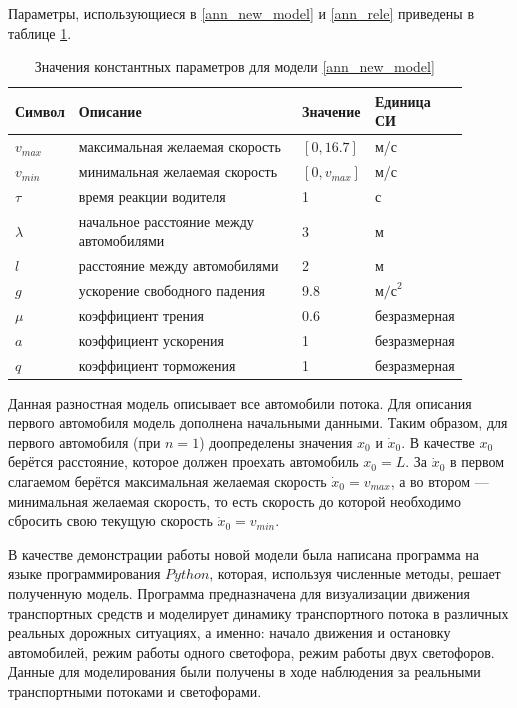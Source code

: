 \documentclass[12pt, a4paper]{extarticle}
\numberwithin{equation}{section}
\numberwithin{figure}{section}
\begin{document}
Параметры, использующиеся в \eqref{ann_new_model} и \eqref{ann_rele} приведены в таблице \ref{parameters}.

\begin{table}[h!]
	\caption{Значения константных параметров для модели \eqref{ann_new_model} }
	\label{parameters}
	\begin{center}
		\begin{tabularx}{\textwidth}{p{0.12\linewidth}p{0.52\linewidth}p{0.11\linewidth}p{0.15\linewidth}}			
			\hline
			\rule{0cm}{0,5cm}
			Символ & Описание & Значение & Единица СИ \\
			[3pt]\hline
			$v_{max}$ & максимальная желаемая скорость& $[0,16.7]$&м/с\\
			$v_{min}$ & минимальная желаемая скорость& $[0,v_{max}]$&м/с\\ 
			$\tau$ & время реакции водителя& 1&с\\
			$\lambda$ & начальное расстояние между автомобилями& 3&м\\
			$l$ & расстояние между автомобилями& 2&м\\
			$g$ & ускорение свободного падения& 9.8&$\text{м/с}^2$\\ 
			$\mu$ & коэффициент трения& 0.6& безразмерная\\ 
			$a$ & коэффициент ускорения& 1& безразмерная\\
			$q$ & коэффициент торможения& 1& безразмерная\\
			\hline
		\end{tabularx}
	\end{center}
\end{table}

Данная разностная модель описывает все автомобили потока. Для описания первого автомобиля модель  дополнена начальными данными. Таким образом, для первого автомобиля (при $n=1$) доопределены значения $x_{0}$ и $\dot{x}_{0}$. В качестве $x_{0}$ берётся расстояние, которое должен проехать автомобиль $x_{0}=L$. За $\dot{x}_{0}$ в первом слагаемом берётся максимальная желаемая скорость $\dot{x}_{0}=v_{max}$, а во втором --- минимальная желаемая скорость, то есть скорость до которой необходимо сбросить свою текущую скорость $\dot{x}_{0}=v_{min}$.

В качестве демонстрации работы новой модели была написана программа на языке программирования $Python$, которая, используя численные методы, решает полученную модель. Программа предназначена для визуализации движения транспортных средств и моделирует динамику транспортного потока в различных реальных дорожных ситуациях, а именно: начало движения и остановку автомобилей, режим работы одного светофора, режим работы двух светофоров. Данные для моделирования были получены в ходе наблюдения за реальными транспортными потоками и светофорами.
\end{document}
